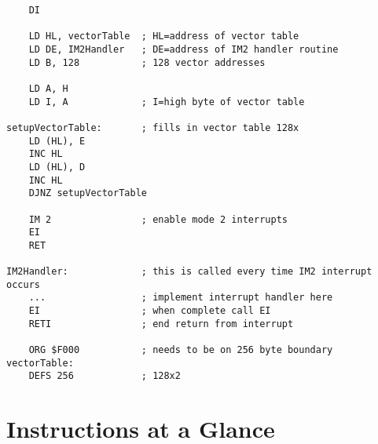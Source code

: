\documentclass[12pt,twoside,openright,a4paper]{book}
\begin{document}
\begin{Verbatim}
	DI
	
	LD HL, vectorTable  ; HL=address of vector table
	LD DE, IM2Handler   ; DE=address of IM2 handler routine
	LD B, 128           ; 128 vector addresses

	LD A, H
	LD I, A             ; I=high byte of vector table

setupVectorTable:       ; fills in vector table 128x
	LD (HL), E
	INC HL
	LD (HL), D
	INC HL
	DJNZ setupVectorTable 

	IM 2                ; enable mode 2 interrupts
	EI
	RET

IM2Handler:             ; this is called every time IM2 interrupt occurs
	...                 ; implement interrupt handler here
	EI                  ; when complete call EI
	RETI                ; end return from interrupt

	ORG $F000           ; needs to be on 256 byte boundary
vectorTable:
	DEFS 256            ; 128x2
\end{Verbatim}



\pagebreak
\chapter{Instructions at a Glance}

\end{document}
